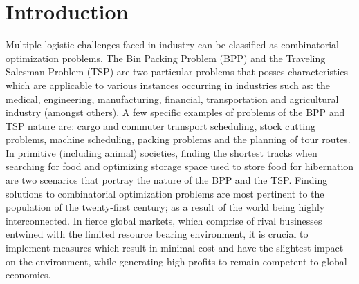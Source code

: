 \section{Introduction}
Multiple logistic challenges faced in industry can be classified as combinatorial optimization problems. The Bin Packing Problem (BPP) and the Traveling Salesman Problem (TSP) are two particular problems that posses characteristics which are applicable to various instances occurring in industries such as: the medical, engineering, manufacturing, financial, transportation and agricultural industry (amongst others). A few specific examples of problems of the BPP and TSP nature are: cargo and commuter transport scheduling, stock cutting problems, machine scheduling, packing problems and the planning of tour routes. In primitive (including animal) societies, finding the shortest tracks when searching for food and optimizing storage space used to store food for hibernation are two scenarios that portray the nature of the BPP and the TSP.  Finding solutions to combinatorial optimization problems are most pertinent to the population of the  twenty-first century; as a result of the world being highly interconnected. In fierce global markets, which comprise of rival businesses entwined with the limited resource bearing environment, it is crucial to implement measures which result in minimal cost and have the slightest impact on the environment, while generating high profits to remain competent to global economies.\\
